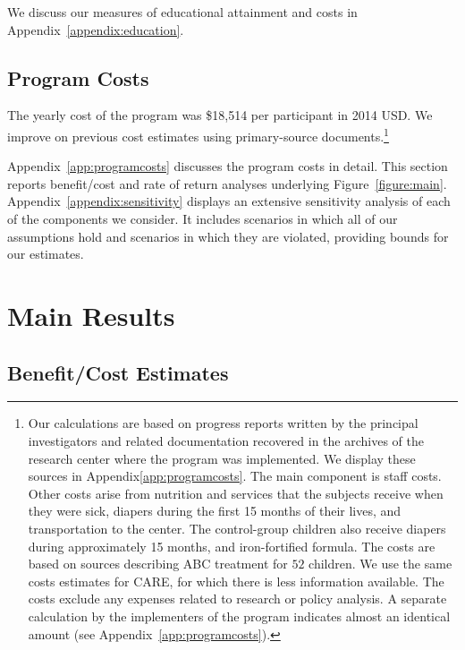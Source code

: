 We discuss our measures of educational attainment and costs in  Appendix~\ref{appendix:education}. 

\subsection{Program Costs} \label{section:programscosts}

The yearly cost of the program was \$18,514 per participant in 2014 USD. We improve on previous cost estimates using primary-source documents.\footnote{Our calculations are based on progress reports written by the principal investigators and related documentation recovered in the archives of the research center where the program was implemented. We display these sources in Appendix\ref{app:programcosts}. The main component is staff costs. Other costs arise from nutrition and services that the subjects receive when they were sick, diapers during the first 15 months of their lives, and transportation to the center. The control-group children also receive diapers during approximately 15 months, and iron-fortified formula. The costs are based on sources describing ABC treatment for $52$ children. We use the same costs estimates for CARE, for which there is less information available. The costs exclude any expenses related to research or policy analysis. A separate calculation by the implementers of the program indicates almost an identical amount (see  Appendix~\ref{app:programcosts}).}

Appendix~\ref{app:programcosts} discusses the program costs in detail. This section reports benefit/cost and rate of return analyses underlying Figure~\ref{figure:main}.  Appendix~\ref{appendix:sensitivity} displays an extensive sensitivity analysis of each of the components we consider. It includes scenarios in which all of our assumptions hold and scenarios in which they are violated, providing bounds for our estimates.

\section{Main Results} \label{section:cbaresults}

\subsection{Benefit/Cost Estimates}

